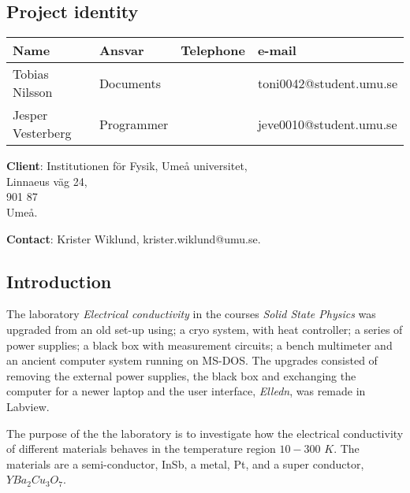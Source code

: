 \documentclass[a4paper,12pt]{article}
\begin{document}
\pagestyle{fancy}
\headheight 35pt 
\rhead{\small\today \\ }
\chead{\projektnamn}
\lhead{\organisation \\ }
\cfoot{\thepage}
\rfoot{\projektgrupp}
\begin{center}

\section*{\center Project identity}

\bigskip
\begin{tabular}{|p{35mm}|p{30mm}|p{20mm}|p{45mm}|}
\hline
\textbf{Name} & \textbf{Ansvar} & \textbf{Telephone} & \textbf{e-mail}\\
\hline
Tobias Nilsson & Documents &  & toni0042@student.umu.se\\
\hline
Jesper Vesterberg & Programmer &  & jeve0010@student.umu.se\\
\hline
\end{tabular}

\bigskip
\textbf{Client}: Institutionen för Fysik, Umeå universitet, \\
Linnaeus väg 24,\\
901 87\\
Umeå.

\textbf{Contact}: Krister Wiklund, krister.wiklund@umu.se.
\end{center}
\newpage

\tableofcontents
\newpage
{}

\subsection{Introduction}
The laboratory \emph{Electrical conductivity} in the courses \emph{Solid State Physics} was upgraded from an old set-up using; a cryo system, with heat controller; a series of power supplies; a black box with measurement circuits; a bench multimeter and an ancient  computer system running on MS-DOS. The upgrades consisted of removing the external power supplies, the black box and exchanging the computer for a newer laptop and the user interface, \emph{Elledn}, was remade in Labview.

The purpose of the the laboratory is to investigate how the electrical conductivity of different materials behaves in the temperature region $10-300$ $K$. The materials are a semi-conductor, InSb, a metal, Pt, and a super conductor, $YBa_2Cu_3O_7$.
\end{document}
